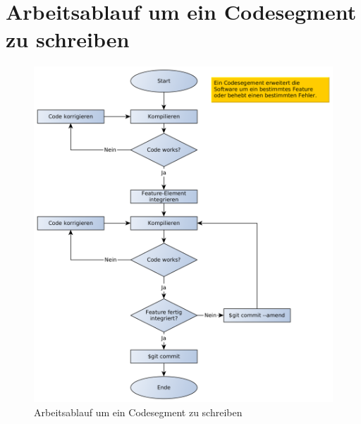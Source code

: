 \section{Arbeitsablauf um ein Codesegment zu schreiben}
\label{anhangAblaufCodesegement}

\begin{figure}[!ht]
\centering
\includegraphics[angle=0,width=\textwidth]{images/ablaufCodesegmentSchreiben.png}
\caption{Arbeitsablauf um ein Codesegment zu schreiben}
\label{fig:arbeitsablaufSoftwareentwicklung}
\end{figure}

